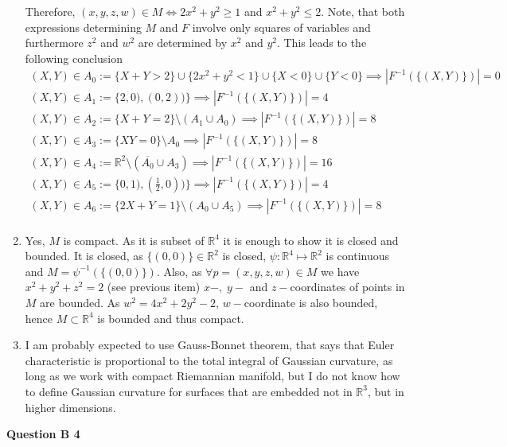 \documentclass[8pt]{article} %
\newcommand{\myabs}[1]{\left|#1\right|}
\newcommand{\questionB}[1]{\noindent\textbf{Question B #1}\par}
\begin{document}
\begin{enumerate}[label=(\arabic*)]
{	Therefore, $(x,y,z,w)\in M\iff 2x^2+y^2\geq 1$ and $x^2+y^2\leq 2$. Note, that both expressions determining $M$ and $F$ involve
	only squares of variables and furthermore $z^2$ and $w^2$ are determined by $x^2$ and $y^2$. This leads to the following conclusion
	\begin{gather}
		(X,Y)\in A_0:=\{X+Y>2\}\cup\{2x^2+y^2<1\}\cup\{X<0\}\cup\{Y<0\}\implies\myabs{F^{-1}(\{(X,Y)\})}=0\\
		(X,Y)\in A_1:=\{2,0),(0,2))\}\implies\myabs{F^{-1}(\{(X,Y)\})}=4\\
		(X,Y)\in A_2:=\{X+Y=2\}\setminus (A_1\cup A_0)\implies\myabs{F^{-1}(\{(X,Y)\})}=8\\
		(X,Y)\in A_3:=\{XY=0\}\setminus A_0\implies\myabs{F^{-1}(\{(X,Y)\})}=8\\
		(X,Y)\in A_4:=\mathbb{R}^2\setminus(\overline{A_0}\cup A_3)\implies\myabs{F^{-1}(\{(X,Y)\})}=16\\
		(X,Y)\in A_5:=\{0,1),(\frac{1}{2},0))\}\implies\myabs{F^{-1}(\{(X,Y)\})}=4\\
		(X,Y)\in A_6:=\{2X+Y=1\}\setminus(A_0\cup A_5)\implies\myabs{F^{-1}(\{(X,Y)\})}=8\\
	\end{gather}
	}
\item{Yes, $M$ is compact. As it is subset of $\mathbb{R}^4$ it is enough to show it is closed and bounded. It is closed, as $\{(0,0)\}\in\mathbb{R}
	^2$ is closed, $\psi:\mathbb{R}^4\mapsto\mathbb{R}^2$ is continuous and $M=\psi^{-1}(\{(0,0)\})$. Also, as $\forall p=(x,y,z,w)\in M$
	we have $x^2+y^2+z^2=2$ (see previous item) $x-,\;y-$ and $z-$coordinates of points in $M$ are bounded. As $w^2=4x^2+2y^2-2$, $w-$coordinate
	is also bounded, hence $M\subset\mathbb{R}^4$ is bounded and thus compact.
	}
\item{I am probably expected to use Gauss-Bonnet theorem, that says that Euler characteristic is proportional to the total integral of Gaussian
	curvature, as long as we work with compact Riemannian manifold, but I do not know how to define Gaussian curvature for surfaces that
	are embedded not in $\mathbb{R}^3$, but in higher dimensions.
	}
\end{enumerate}
\questionB{4}
\end{document}
